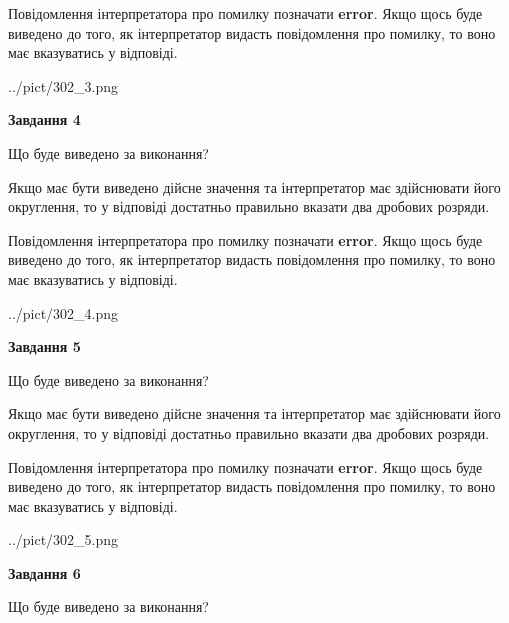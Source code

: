 \documentclass[12pt, ukrainian]{article}
\begin{document}
{\begin {Large}
Повідомлення інтерпретатора про помилку позначати \textbf{error}.
Якщо щось буде виведено до того, як інтерпретатор видасть повідомлення про помилку, 
то воно має вказуватись у відповіді. \par

\begin{center}
	{../pict/302_3.png}
\end{center}
\newpage

{\begin {center}\textbf{Завдання 4}\end {center}}\par
Що буде виведено за виконання? \par

Якщо має бути виведено дійсне значення та інтерпретатор має здійснювати його округлення, 
то у відповіді достатньо правильно вказати два дробових розряди.

Повідомлення інтерпретатора про помилку позначати \textbf{error}.
Якщо щось буде виведено до того, як інтерпретатор видасть повідомлення про помилку, 
то воно має вказуватись у відповіді. \par

\begin{center}
	{../pict/302_4.png}
\end{center}
\newpage

{\begin {center}\textbf{Завдання 5}\end {center}}\par
Що буде виведено за виконання? \par

Якщо має бути виведено дійсне значення та інтерпретатор має здійснювати його округлення, 
то у відповіді достатньо правильно вказати два дробових розряди.

Повідомлення інтерпретатора про помилку позначати \textbf{error}.
Якщо щось буде виведено до того, як інтерпретатор видасть повідомлення про помилку, 
то воно має вказуватись у відповіді. \par

\begin{center}
	{../pict/302_5.png}
\end{center}
\newpage

{\begin {center}\textbf{Завдання 6}\end {center}}\par
Що буде виведено за виконання? \par


\end{Large}}
\end{document}
